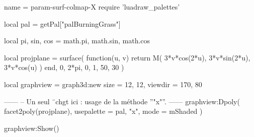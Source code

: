 \documentclass{standalone}
\begin{document}
\begin{luadraw}{name = param-surf-colmap-X}
require 'luadraw_palettes'

local pal = getPal["palBurningGrass"]

local pi, sin, cos = math.pi, math.sin, math.cos

local projplane = surface(
  function(u, v)
    return M(
      3*v*cos(2*u),
      3*v*sin(2*u),
      3*v*cos(u)
    )
  end,
  0, 2*pi, 0, 1,
  {50, 30}
)

local graphview = graph3d:new{
  size    = {12, 12},
  viewdir = {170, 80}
}

------
-- Un seul ¨chgt ici : usage de la méthode ''"x"''.
------
graphview:Dpoly(
  facet2poly(projplane), 
  {
    usepalette = {pal, "x"},
    mode       = mShaded
  }
)

graphview:Show()
\end{luadraw}
\end{document}
